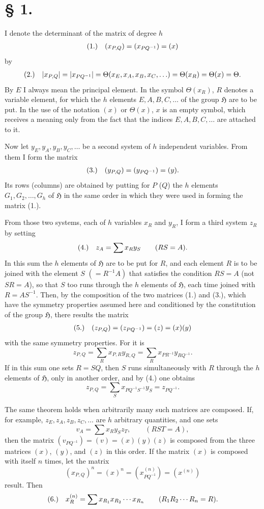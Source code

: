 \documentclass[11pt]{article}
\makeatletter
\newcommand{\Hgrp}{\mathfrak{H}}
\newcommand{\frobtagc}[2]{\[\begin{array}{@{}r@{\quad}c@{}}\textup{(#1)} & \displaystyle #2\end{array}\]}
\makeatother
\begin{document}
\section*{§ 1.}

I denote the determinant of the matrix of degree $h$
\frobtagc{1.}{(x_{P,Q})=(x_{PQ^{-1}})=(x)}
by
\frobtagc{2.}{|x_{P,Q}|=|x_{PQ^{-1}}|=\Theta(x_E,x_A,x_B,x_C,\ldots)=\Theta(x_R)=\Theta(x)=\Theta.}
By $E$ I always mean the principal element. In the symbol $\Theta(x_R)$, $R$ denotes a variable element, for which the $h$ elements $E,A,B,C,\ldots$ of the group $\Hgrp$ are to be put. In the use of the notation $(x)$ or $\Theta(x)$, $x$ is an empty symbol, which receives a meaning only from the fact that the indices $E,A,B,C,\ldots$ are attached to it.

Now let $y_E,y_A,y_B,y_C,\ldots$ be a second system of $h$ independent variables. From them I form the matrix
\frobtagc{3.}{(y_{P,Q})=(y_{PQ^{-1}})=(y).}
Its rows (columns) are obtained by putting for $P$ ($Q$) the $h$ elements $G_1,G_2,\ldots,G_h$ of $\Hgrp$ in the same order in which they were used in forming the matrix (1.).

From those two systems, each of $h$ variables $x_R$ and $y_R$, I form a third system $z_R$ by setting
\frobtagc{4.}{z_A=\sum x_Ry_S\qquad (RS=A).}
In this sum the $h$ elements of $\Hgrp$ are to be put for $R$, and each element $R$ is to be joined with the element $S$ $(=R^{-1}A)$ that satisfies the condition $RS=A$ (not $SR=A$), so that $S$ too runs through the $h$ elements of $\Hgrp$, each time joined with $R=AS^{-1}$. Then, by the composition of the two matrices (1.) and (3.), which have the symmetry properties assumed here and conditioned by the constitution of the group $\Hgrp$, there results the matrix
\frobtagc{5.}{(z_{P,Q})=(z_{PQ^{-1}})=(z)=(x)(y)}
with the same symmetry properties. For it is
\[
z_{P,Q}=\sum_R x_{P,R}y_{R,Q}=\sum_R x_{PR^{-1}}y_{RQ^{-1}}.
\]
If in this sum one sets $R=SQ$, then $S$ runs simultaneously with $R$ through the $h$ elements of $\Hgrp$, only in another order, and by (4.) one obtains
\[
z_{P,Q}=\sum_S x_{PQ^{-1}S^{-1}}y_S=z_{PQ^{-1}}.
\]

The same theorem holds when arbitrarily many such matrices are composed. If, for example, $z_E,z_A,z_B,z_C,\ldots$ are $h$ arbitrary quantities, and one sets
\[
v_A=\sum x_Ry_Sz_T,\qquad (RST=A),
\]
then the matrix $(v_{PQ^{-1}})=(v)=(x)(y)(z)$ is composed from the three matrices $(x)$, $(y)$, and $(z)$ in this order. If the matrix $(x)$ is composed with itself $n$ times, let the matrix
\[
(x_{P,Q})^n=(x)^n=(x_{PQ^{-1}}^{(n)})=(x^{(n)})
\]
result. Then
\frobtagc{6.}{x_R^{(n)}=\sum x_{R_1}x_{R_2}\cdots x_{R_n}\qquad (R_1R_2\cdots R_n=R).}
\end{document}
